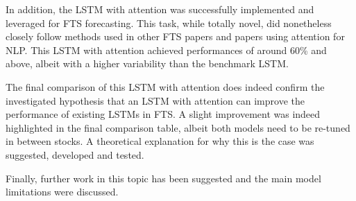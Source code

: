 \documentclass{article}
\begin{document}
In addition, the LSTM with attention was successfully implemented and leveraged for FTS forecasting. This task, while totally novel, did nonetheless closely follow methods used in other FTS papers and papers using attention for NLP. This LSTM with attention achieved performances of around 60\% and above, albeit with a higher variability than the benchmark LSTM.

The final comparison of this LSTM with attention does indeed confirm the investigated hypothesis that an LSTM with attention can improve the performance of existing LSTMs in FTS. A slight improvement was indeed highlighted in the final comparison table, albeit both models need to be re-tuned in between stocks. A theoretical explanation for why this is the case was suggested, developed and tested. 

Finally, further work in this topic has been suggested and the main model limitations were discussed.




\end{document}
